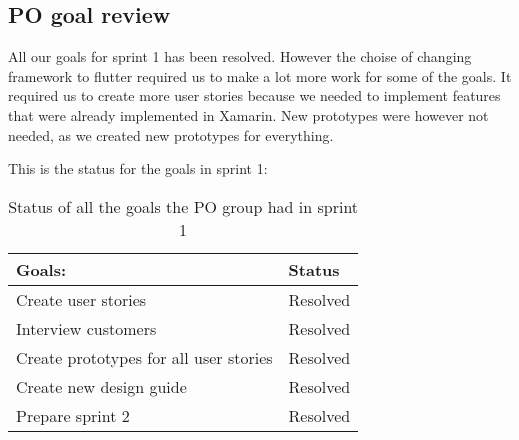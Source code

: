 \subsection{PO goal review}
All our goals for sprint 1 has been resolved. 
However the choise of changing framework to flutter required us to make a lot more work for some of the goals.
It required us to create more user stories because we needed to implement features that were already implemented in Xamarin.
New prototypes were however not needed, as we created new prototypes for everything.

\noindent
This is the status for the goals in sprint 1:
\begin{table}[H]
    \centering
    \begin{tabular}{|l|l|}
    \hline
    Goals:                                 & Status   \\ \hline
    Create user stories                    & Resolved \\ \hline
    Interview customers                    & Resolved \\ \hline
    Create prototypes for all user stories & Resolved \\ \hline
    Create new design guide                & Resolved \\ \hline
    Prepare sprint 2                       & Resolved \\ \hline
    \end{tabular}
    \caption{Status of all the goals the PO group had in sprint 1}
    \label{PO-goal-review}
\end{table}


